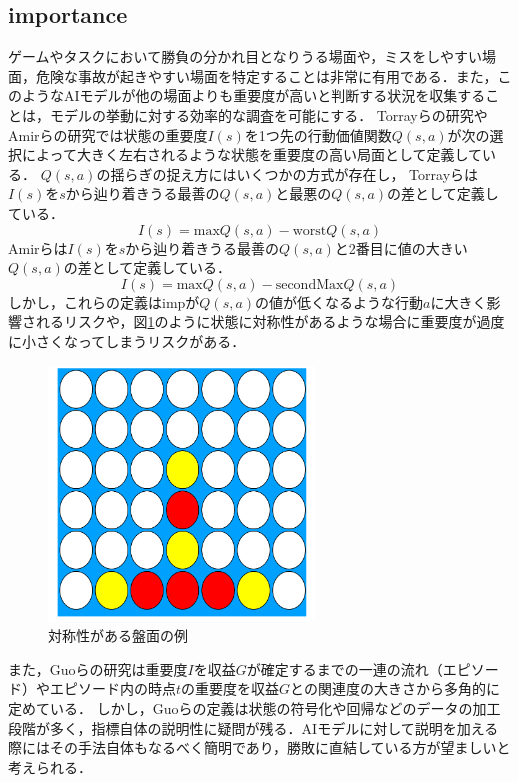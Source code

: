 \subsection{importance}
ゲームやタスクにおいて勝負の分かれ目となりうる場面や，ミスをしやすい場面，危険な事故が起きやすい場面を特定することは非常に有用である．また，このようなAIモデルが他の場面よりも重要度が高いと判断する状況を収集することは，モデルの挙動に対する効率的な調査を可能にする．
Torrayらの研究\cite{imp2013}やAmirらの研究\cite{imp2016}では状態の重要度$I(s)$を1つ先の行動価値関数$Q(s, a)$が次の選択によって大きく左右されるような状態を重要度の高い局面として定義している．
$Q(s, a)$の揺らぎの捉え方にはいくつかの方式が存在し，
Torrayらは$I(s)$を$s$から辿り着きうる最善の$Q(s, a)$と最悪の$Q(s, a)$の差として定義している．
\begin{equation}
	{I(s)= \textrm{max}Q(s, a)-\textrm{worst}Q(s, a)}
\end{equation}
Amirらは$I(s)$を$s$から辿り着きうる最善の$Q(s, a)$と2番目に値の大きい$Q(s, a)$の差として定義している．
\begin{equation}
    \label{imp}
	{I(s)= \textrm{max}Q(s, a)-\textrm{secondMax}Q(s, a)}
\end{equation}
しかし，これらの定義はimpが$Q(s, a)$の値が低くなるような行動$a$に大きく影響されるリスクや，図\ref{fig:symmetry}のように状態に対称性があるような場合に重要度が過度に小さくなってしまうリスクがある．
\begin{figure}[t]
	\centering
	\includegraphics[width=200pt]{./figure/symmetry.png}
	\caption{対称性がある盤面の例}
	\label{fig:symmetry}
\end{figure}
また，Guoらの研究\cite{EDGE}は重要度$I$を収益$G$が確定するまでの一連の流れ（エピソード）やエピソード内の時点$t$の重要度を収益$G$との関連度の大きさから多角的に定めている．
しかし，Guoらの定義は状態の符号化や回帰などのデータの加工段階が多く，指標自体の説明性に疑問が残る．AIモデルに対して説明を加える際にはその手法自体もなるべく簡明であり，勝敗に直結している方が望ましいと考えられる．





